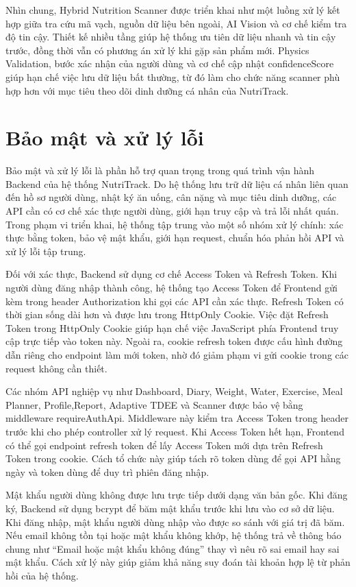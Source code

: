 \documentclass[12pt, a4paper]{report}
\begin{document}
Nhìn chung, Hybrid Nutrition Scanner được triển khai như một luồng xử lý kết hợp giữa tra cứu mã vạch, nguồn dữ liệu bên ngoài, AI Vision và cơ chế kiểm tra độ tin cậy. Thiết kế nhiều tầng giúp hệ thống ưu tiên dữ liệu nhanh và tin cậy trước, đồng thời vẫn có phương án xử lý khi gặp sản phẩm mới. Physics Validation, bước xác nhận của người dùng và cơ chế cập nhật confidenceScore giúp hạn chế việc lưu dữ liệu bất thường, từ đó làm cho chức năng scanner phù hợp hơn với mục tiêu theo dõi dinh dưỡng cá nhân của NutriTrack.

\section{Bảo mật và xử lý lỗi}Bảo mật và xử lý lỗi là phần hỗ trợ quan trọng trong quá trình vận hành Backend của hệ thống NutriTrack. Do hệ thống lưu trữ dữ liệu cá nhân liên quan đến hồ sơ người dùng, nhật ký ăn uống, cân nặng và mục tiêu dinh dưỡng, các API cần có cơ chế xác thực người dùng, giới hạn truy cập và trả lỗi nhất quán. Trong phạm vi triển khai, hệ thống tập trung vào một số nhóm xử lý chính: xác thực bằng token, bảo vệ mật khẩu, giới hạn request, chuẩn hóa phản hồi API và xử lý lỗi tập trung.

Đối với xác thực, Backend sử dụng cơ chế Access Token và Refresh Token. Khi người dùng đăng nhập thành công, hệ thống tạo Access Token để Frontend gửi kèm trong header Authorization khi gọi các API cần xác thực. Refresh Token có thời gian sống dài hơn và được lưu trong HttpOnly Cookie. Việc đặt Refresh Token trong HttpOnly Cookie giúp hạn chế việc JavaScript phía Frontend truy cập trực tiếp vào token này. Ngoài ra, cookie refresh token được cấu hình đường dẫn riêng cho endpoint làm mới token, nhờ đó giảm phạm vi gửi cookie trong các request không cần thiết.

Các nhóm API nghiệp vụ như Dashboard, Diary, Weight, Water, Exercise, Meal Planner, Profile,Report, Adaptive TDEE và Scanner được bảo vệ bằng middleware requireAuthApi. Middleware này kiểm tra Access Token trong header trước khi cho phép controller xử lý request. Khi Access Token hết hạn, Frontend có thể gọi endpoint refresh token để lấy Access Token mới dựa trên Refresh Token trong cookie. Cách tổ chức này giúp tách rõ token dùng để gọi API hằng ngày và token dùng để duy trì phiên đăng nhập.

Mật khẩu người dùng không được lưu trực tiếp dưới dạng văn bản gốc. Khi đăng ký, Backend sử dụng bcrypt để băm mật khẩu trước khi lưu vào cơ sở dữ liệu. Khi đăng nhập, mật khẩu người dùng nhập vào được so sánh với giá trị đã băm. Nếu email không tồn tại hoặc mật khẩu không khớp, hệ thống trả về thông báo chung như “Email hoặc mật khẩu không đúng” thay vì nêu rõ sai email hay sai mật khẩu. Cách xử lý này giúp giảm khả năng suy đoán tài khoản hợp lệ từ phản hồi của hệ thống.
\end{document}
